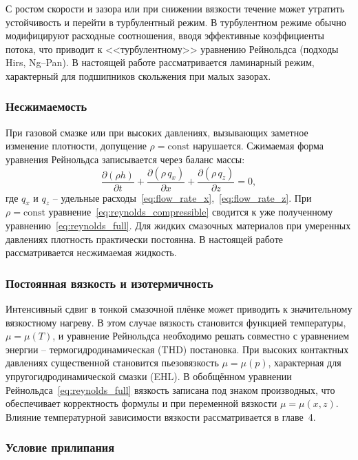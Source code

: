С ростом скорости и зазора или при снижении вязкости течение может утратить устойчивость и перейти в турбулентный режим. В турбулентном режиме обычно модифицируют расходные соотношения, вводя эффективные коэффициенты потока, что приводит к <<турбулентному>> уравнению Рейнольдса (подходы Hirs, Ng--Pan). В настоящей работе рассматривается ламинарный режим, характерный для подшипников скольжения при малых зазорах.

\subsubsection*{Несжимаемость}

При газовой смазке или при высоких давлениях, вызывающих заметное изменение плотности, допущение $\rho = \mathrm{const}$ нарушается. Сжимаемая форма уравнения Рейнольдса записывается через баланс массы:
\begin{equation}
\frac{\partial (\rho h)}{\partial t}
+ \frac{\partial (\rho\, q_x)}{\partial x}
+ \frac{\partial (\rho\, q_z)}{\partial z} = 0,
\label{eq:reynolds_compressible}
\end{equation}
где $q_x$ и $q_z$ -- удельные расходы~\eqref{eq:flow_rate_x},~\eqref{eq:flow_rate_z}. При $\rho = \mathrm{const}$ уравнение~\eqref{eq:reynolds_compressible} сводится к уже полученному уравнению~\eqref{eq:reynolds_full}. Для жидких смазочных материалов при умеренных давлениях плотность практически постоянна. В настоящей работе рассматривается несжимаемая жидкость.

\subsubsection*{Постоянная вязкость и изотермичность}

Интенсивный сдвиг в тонкой смазочной плёнке может приводить к значительному вязкостному нагреву. В этом случае вязкость становится функцией температуры, $\mu = \mu(T)$, и уравнение Рейнольдса необходимо решать совместно с уравнением энергии -- термогидродинамическая (THD) постановка. При высоких контактных давлениях существенной становится пьезовязкость $\mu = \mu(p)$, характерная для упругогидродинамической смазки (EHL). В обобщённом уравнении Рейнольдса~\eqref{eq:reynolds_full} вязкость записана под знаком производных, что обеспечивает корректность формулы и при переменной вязкости $\mu = \mu(x, z)$. Влияние температурной зависимости вязкости рассматривается в главе~4.

\subsubsection*{Условие прилипания}

